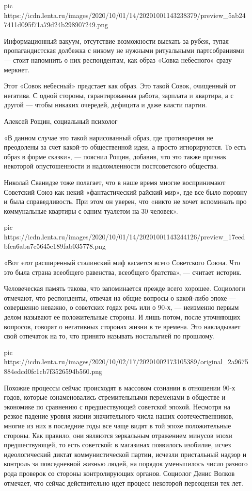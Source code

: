 \ifcmt
pic https://icdn.lenta.ru/images/2020/10/01/14/20201001143238379/preview_5ab247411d095f71a79d24b298907249.png
\fi

Информационный вакуум, отсутствие возможности выехать за рубеж, тупая
пропагандистская долбежка с никому не нужными ритуальными партсобраниями —
стоит напомнить о них респондентам, как образ «Совка небесного» сразу меркнет.

Этот «Совок небесный» предстает как образ. Это такой Совок, очищенный от
негатива. С одной стороны, гарантированная работа, зарплата и квартира, а с
другой --- чтобы никаких очередей, дефицита и даже власти партии.

Алексей Рощин, социальный психолог

«В данном случае это такой нарисованный образ, где противоречия не преодолены
за счет какой-то общественной идеи, а просто игнорируются. То есть образ в
форме сказки», --- пояснил Рощин, добавив, что это также признак некоторой
опустошенности и надломленности постсоветского общества.

Николай Сванидзе тоже полагает, что в наше время многие воспринимают Советский
Союз как некий «фантастический райский мир», где все было поровну и была
справедливость. При этом он уверен, что «никто не хочет вспоминать про
коммунальные квартиры с одним туалетом на 30 человек».

\ifcmt
pic https://icdn.lenta.ru/images/2020/10/01/14/20201001143244126/preview_17eedbfca6aba7c5645e189fab035778.png
\fi

«Вот этот расширенный сталинский миф касается всего Советского Союза. Что это
была страна всеобщего равенства, всеобщего братства», --- считает историк.

Человеческая память такова, что запоминается прежде всего хорошее. Социологи
отмечают, что респонденты, отвечая на общие вопросы о какой-либо эпохе —
совершенно неважно, о советских годах речь или о 90-х, --- неизменно первым делом
называют ее положительные стороны. И лишь потом, после уточняющих вопросов,
говорят о негативных сторонах жизни в те времена. Это накладывает свой
отпечаток на то, что принято называть ностальгией по прошлому.

\ifcmt
pic https://icdn.lenta.ru/images/2020/10/02/17/20201002173105389/original_2a9675884edcd0fc1cb7f3526594b560.png
\fi

Похожие процессы сейчас происходят в массовом сознании в отношении 90-х годов,
которые ознаменовались стремительными переменами в обществе и экономике по
сравнению с предшествующей советской эпохой. Несмотря на резкое падение уровня
жизни значительного числа наших соотечественников, многие из них в последние
годы все чаще видят в той эпохе положительные стороны. Как правило, они
являются зеркальным отражением минусов эпохи предшествующей, то есть советской:
в магазинах появилось изобилие, исчез идеологический диктат коммунистической
партии, исчезли пристальный надзор и контроль за повседневной жизнью людей, на
порядок уменьшилось число разного рода проверок со стороны контролирующих
органов. Социолог Денис Волков отмечает, что сейчас действительно идет процесс
некоторой переоценки тех лет.

